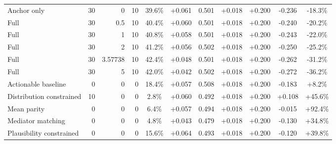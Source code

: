 \begin{table}[htbp]
\begin{tabular}{lrrrccccccc}
Anchor only & 30 & 0 & 10 & 39.6\% & +0.061 & 0.501 & +0.018 & +0.200 & -0.236 & -18.3\% \\
Full & 30 & 0.5 & 10 & 40.4\% & +0.060 & 0.501 & +0.018 & +0.200 & -0.240 & -20.2\% \\
Full & 30 & 1 & 10 & 40.8\% & +0.058 & 0.501 & +0.018 & +0.200 & -0.243 & -22.0\% \\
Full & 30 & 2 & 10 & 41.2\% & +0.056 & 0.502 & +0.018 & +0.200 & -0.250 & -25.2\% \\
Full & 30 & 3.57738 & 10 & 42.4\% & +0.048 & 0.501 & +0.018 & +0.200 & -0.262 & -31.2\% \\
Full & 30 & 5 & 10 & 42.0\% & +0.042 & 0.502 & +0.018 & +0.200 & -0.272 & -36.2\% \\
Actionable baseline & 0 & 0 & 0 & 18.4\% & +0.057 & 0.508 & +0.018 & +0.200 & -0.183 & +8.2\% \\
Distribution constrained & 10 & 0 & 0 & 2.8\% & +0.060 & 0.492 & +0.018 & +0.200 & +0.108 & +45.6\% \\
Mean parity & 0 & 0 & 0 & 6.4\% & +0.057 & 0.494 & +0.018 & +0.200 & -0.015 & +92.4\% \\
Mediator matching & 0 & 0 & 0 & 4.8\% & +0.043 & 0.479 & +0.018 & +0.200 & -0.130 & +34.8\% \\
Plausibility constrained & 0 & 0 & 0 & 15.6\% & +0.064 & 0.493 & +0.018 & +0.200 & -0.120 & +39.8\% \\
\bottomrule
\end{tabular}
\end{table}